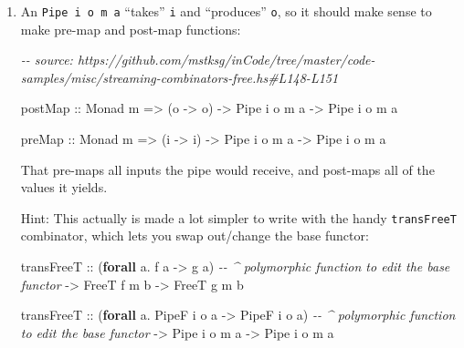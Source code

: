 \documentclass[]{article}
\newenvironment{Shaded}{}{}
\newcommand{\CommentTok}[1]{\textcolor[rgb]{0.38,0.63,0.69}{\textit{#1}}}
\newcommand{\DataTypeTok}[1]{\textcolor[rgb]{0.56,0.13,0.00}{#1}}
\newcommand{\KeywordTok}[1]{\textcolor[rgb]{0.00,0.44,0.13}{\textbf{#1}}}
\newcommand{\NormalTok}[1]{#1}
\newcommand{\OperatorTok}[1]{\textcolor[rgb]{0.40,0.40,0.40}{#1}}
\newcommand{\OtherTok}[1]{\textcolor[rgb]{0.00,0.44,0.13}{#1}}
\begin{document}
\begin{enumerate}
\def\labelenumi{\arabic{enumi}.}
\item
  An \texttt{Pipe\ i\ o\ m\ a} ``takes'' \texttt{i} and ``produces'' \texttt{o},
  so it should make sense to make pre-map and post-map functions:

\begin{Shaded}
\begin{Highlighting}[]
\CommentTok{{-}{-} source: https://github.com/mstksg/inCode/tree/master/code{-}samples/misc/streaming{-}combinators{-}free.hs\#L148{-}L151}

\OtherTok{postMap ::} \DataTypeTok{Monad}\NormalTok{ m }\OtherTok{=\textgreater{}}\NormalTok{ (o }\OtherTok{{-}\textgreater{}}\NormalTok{ o\textquotesingle{}) }\OtherTok{{-}\textgreater{}} \DataTypeTok{Pipe}\NormalTok{ i o m a }\OtherTok{{-}\textgreater{}} \DataTypeTok{Pipe}\NormalTok{ i o\textquotesingle{} m a}

\OtherTok{preMap ::} \DataTypeTok{Monad}\NormalTok{ m }\OtherTok{=\textgreater{}}\NormalTok{ (i\textquotesingle{} }\OtherTok{{-}\textgreater{}}\NormalTok{ i) }\OtherTok{{-}\textgreater{}} \DataTypeTok{Pipe}\NormalTok{ i o m a }\OtherTok{{-}\textgreater{}} \DataTypeTok{Pipe}\NormalTok{ i\textquotesingle{} o m a}
\end{Highlighting}
\end{Shaded}

  That pre-maps all inputs the pipe would receive, and post-maps all of the
  values it yields.

  Hint: This actually is made a lot simpler to write with the handy
  \texttt{transFreeT} combinator, which lets you swap out/change the base
  functor:

\begin{Shaded}
\begin{Highlighting}[]
\NormalTok{transFreeT}
\OtherTok{    ::}\NormalTok{ (}\KeywordTok{forall}\NormalTok{ a}\OperatorTok{.}\NormalTok{ f a }\OtherTok{{-}\textgreater{}}\NormalTok{ g a)     }\CommentTok{{-}{-} \^{} polymorphic function to edit the base functor}
    \OtherTok{{-}\textgreater{}} \DataTypeTok{FreeT}\NormalTok{ f m b}
    \OtherTok{{-}\textgreater{}} \DataTypeTok{FreeT}\NormalTok{ g m b}

\NormalTok{transFreeT}
\OtherTok{    ::}\NormalTok{ (}\KeywordTok{forall}\NormalTok{ a}\OperatorTok{.} \DataTypeTok{PipeF}\NormalTok{ i o a }\OtherTok{{-}\textgreater{}} \DataTypeTok{PipeF}\NormalTok{ i\textquotesingle{} o\textquotesingle{} a)  }\CommentTok{{-}{-} \^{} polymorphic function to edit the base functor}
    \OtherTok{{-}\textgreater{}} \DataTypeTok{Pipe}\NormalTok{ i  o  m a}
    \OtherTok{{-}\textgreater{}} \DataTypeTok{Pipe}\NormalTok{ i\textquotesingle{} o\textquotesingle{} m a}
\end{Highlighting}
\end{Shaded}


\end{enumerate}
\end{document}
